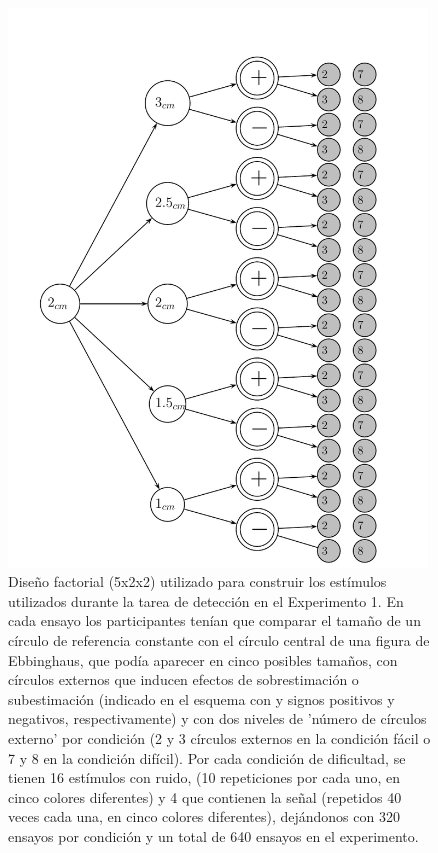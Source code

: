 \begin{itemize}
\begin{figure}[th]
\centering
\includegraphics[width=0.99\textwidth]{Figures/Estimulos_Experimento1} 
\decoRule
\caption[Diseño de Estimulos en el Experimento 1]{Diseño factorial (5x2x2) utilizado para construir los estímulos utilizados durante la tarea de detección en el Experimento 1. En cada ensayo los participantes tenían que comparar el tamaño de un círculo de referencia constante con el círculo central de una figura de Ebbinghaus, que podía aparecer en cinco posibles tamaños, con círculos externos que inducen efectos de sobrestimación o subestimación (indicado en el esquema con  y signos positivos y negativos, respectivamente) y con dos niveles de 'número de círculos externo' por condición (2 y 3 círculos externos en la condición fácil o 7 y 8 en la condición difícil). Por cada condición de dificultad, se tienen 16 estímulos con ruido, (10 repeticiones por cada uno, en cinco colores diferentes) y 4 que contienen la señal (repetidos 40 veces cada una, en cinco colores diferentes), dejándonos con 320 ensayos por condición y un total de 640 ensayos en el experimento.}
\label{fig:Exp_1}
\end{figure}




\end{itemize}
